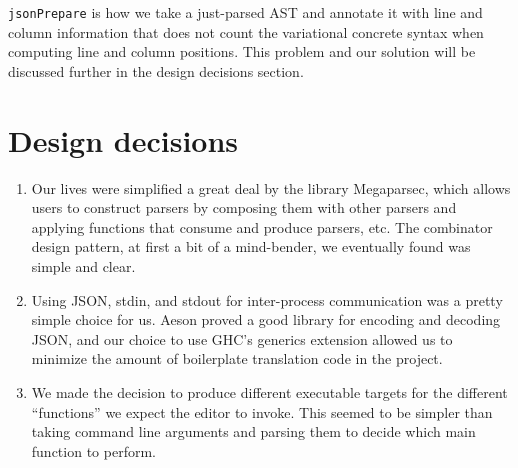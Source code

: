 \documentclass[11pt]{article}
\begin{document}
\texttt{jsonPrepare} is how we take a just-parsed AST and annotate it with line and column information that does not count the variational concrete syntax when computing line and column positions. This problem and our solution will be discussed further in the design decisions section.

\section{Design decisions}
\begin{enumerate}
\item Our lives were simplified a great deal by the library Megaparsec, which allows users to construct parsers by composing them with other parsers and applying functions that consume and produce parsers, etc. The combinator design pattern, at first a bit of a mind-bender, we eventually found was simple and clear.
\item Using JSON, stdin, and stdout for inter-process communication was a pretty simple choice for us. Aeson proved a good library for encoding and decoding JSON, and our choice to use GHC's generics extension allowed us to minimize the amount of boilerplate translation code in the project.
\item We made the decision to produce different executable targets for the different ``functions'' we expect the editor to invoke. This seemed to be simpler than taking command line arguments and parsing them to decide which main function to perform.
\end{enumerate}
\end{document}
